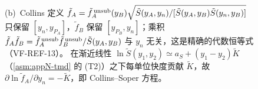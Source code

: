 \begin{figure}[htbp]
{(b)~Collins 定义 $\tilde f_A=\tilde f_A^{\,\rm unsub}(y_B)\sqrt{\tilde S(y_A,y_n)/[\tilde S(y_A,y_B)\tilde S(y_n,y_B)]}$ 只保留 $[y_n,y_{P_A}]$，$\tilde f_B$ 保留 $[y_{P_B},y_n]$；乘积 $\tilde f_A\tilde f_B=\tilde f_A^{\,\rm unsub}\tilde f_B^{\,\rm unsub}/\tilde S(y_A,y_B)$ 与 $y_n$ 无关，这是精确的代数恒等式（VF-REF-13）。
在渐近线性 $\ln\tilde S(y_1,y_2)\simeq a_S+(y_1-y_2)\tilde K$（\cref{asm:appN-tmd} 的 (T2)）之下每单位快度贡献 $\tilde K$，故 $\partial\ln\tilde f_A/\partial y_n=-\tilde K$，即 Collins--Soper 方程。}
\label{fig:tmd-rapidity-bars}
\end{figure}

